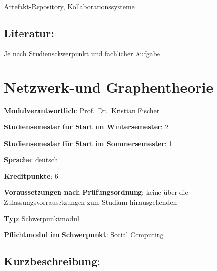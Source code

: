 Artefakt-Repository, Kollaborationssysteme

\section*{Literatur:\label{/mi-2017/modulbeschreibungen-master/MA_Modul_Projekt_Vision&Konzept}}\label{literaturpathlabelmi-2017modulbeschreibungen-mastermaux5fmodulux5fprojektux5fvisionkonzept}

Je nach Studienschwerpunkt und fachlicher Aufgabe

\chapter{Netzwerk-und
Graphentheorie\label{/mi-2017/modulbeschreibungen-master/MA_SC_Modul_Netzwerk--und-Graphentheorie}}\label{netzwerk-und-graphentheoriepathlabelmi-2017modulbeschreibungen-mastermaux5fscux5fmodulux5fnetzwerkund-graphentheorie}

\begin{modulHead}
\textbf{Modulverantwortlich}: Prof.~Dr.~Kristian
Fischer
\end{modulHead}
\begin{modulHead}
\textbf{Studiensemester für
Start im Wintersemester}:
2
\end{modulHead}
\begin{modulHead}
\textbf{Studiensemester für Start
im Sommersemester}:
1
\end{modulHead}
\begin{modulHead}
\textbf{Sprache}:
deutsch
\end{modulHead}
\begin{modulHead}
\textbf{Kreditpunkte}:
6
\end{modulHead}
\begin{modulHead}
\textbf{Voraussetzungen nach
Prüfungsordnung}: keine über die Zulassungsvorrausetzungen zum Studium
hinausgehenden
\end{modulHead}
\begin{modulHead}
\textbf{Typ}:
Schwerpunktmodul
\end{modulHead}
\begin{modulHead}
\textbf{Pflichtmodul
im Schwerpunkt}: Social Computing
\end{modulHead}


\section*{Kurzbeschreibung:\label{/mi-2017/modulbeschreibungen-master/MA_SC_Modul_Netzwerk--und-Graphentheorie}}\label{kurzbeschreibungpathlabelmi-2017modulbeschreibungen-mastermaux5fscux5fmodulux5fnetzwerkund-graphentheorie}

